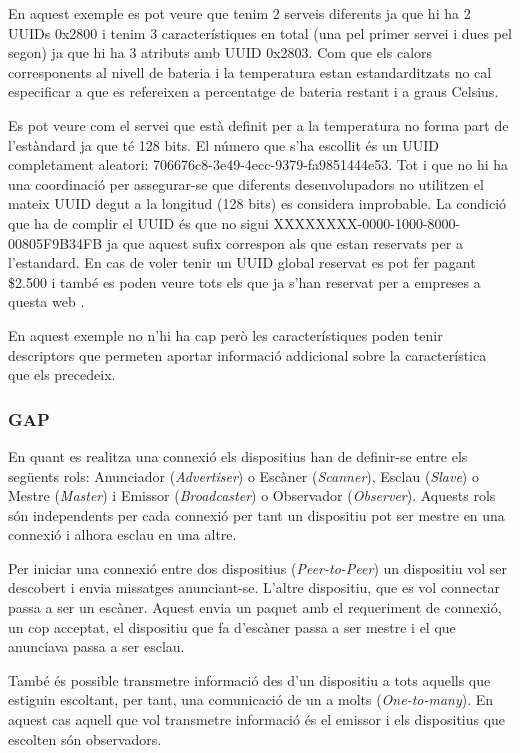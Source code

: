 En aquest exemple es pot veure que tenim 2 serveis diferents ja que hi ha 2 UUIDs 0x2800 i tenim 3 característiques en total (una pel primer servei i dues pel segon) ja que hi ha 3 atributs amb UUID 0x2803.
Com que els calors corresponents al nivell de bateria i la temperatura estan estandarditzats no cal especificar a que es refereixen a percentatge de bateria restant i a graus Celsius.

Es pot veure com el servei que està definit per a la temperatura no forma part de l'estàndard ja que té 128 bits. El número que s'ha escollit és un UUID completament aleatori: 706676c8-3e49-4ecc-9379-fa9851444e53. Tot i que no hi ha una coordinació per assegurar-se que diferents desenvolupadors no utilitzen el mateix UUID degut a la longitud (128 bits) es considera improbable. La condició que ha de complir el UUID és que no sigui XXXXXXXX-0000-1000-8000-00805F9B34FB ja que aquest sufix correspon als que estan reservats per a l'estandard. En cas de voler tenir un UUID global reservat es pot fer pagant \$2.500 i també es poden veure tots els que ja s'han reservat per a empreses a questa web \cite{reservedUUIDs}.

En aquest exemple no n'hi ha cap però les característiques poden tenir descriptors \cite{descriptors} que permeten aportar informació addicional sobre la característica que els precedeix.

\subsubsection{GAP}
En quant es realitza una connexió els dispositius han de definir-se entre els següents rols: Anunciador (\textit{Advertiser}) o Escàner (\textit{Scanner}), Esclau (\textit{Slave}) o Mestre (\textit{Master}) i Emissor (\textit{Broadcaster}) o Observador (\textit{Observer}).
Aquests rols són independents per cada connexió per tant un dispositiu pot ser mestre en una connexió i alhora esclau en una altre.

Per iniciar una connexió entre dos dispositius (\textit{Peer-to-Peer}) un dispositiu vol ser descobert i envia missatges anunciant-se. L'altre dispositiu, que es vol connectar passa a ser un escàner. Aquest envia un paquet amb el requeriment de connexió, un cop acceptat, el dispositiu que fa d'escàner passa a ser mestre i el que anunciava passa a ser esclau.

També és possible transmetre informació des d'un dispositiu a tots aquells que estiguin escoltant, per tant, una comunicació de un a molts (\textit{One-to-many}). En aquest cas aquell que vol transmetre informació és el emissor i els dispositius que escolten són observadors.

